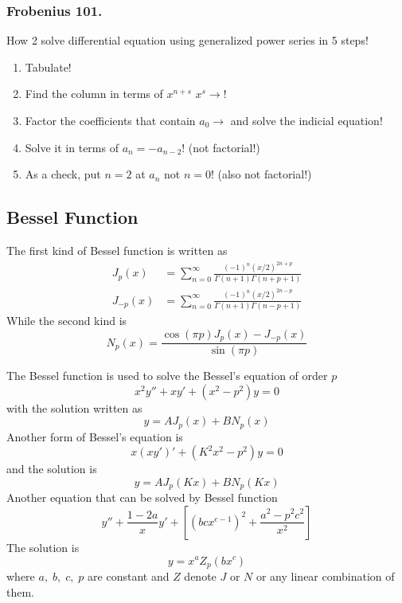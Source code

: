 \documentclass[../main.tex]{subfiles}
\begin{document}
\subsubsection*{Frobenius 101.} How 2 solve differential equation using generalized power series in 5 steps!
\begin{enumerate}
    \item Tabulate!
    \item Find the column in terms of $x^{n+s}$ $x^s\rightarrow$!
    \item Factor the coefficients that contain $a_0\rightarrow$ and solve the indicial equation!
    \item Solve it in terms of $a_n=-a_{n-2}$! (not factorial!)
    \item As a check, put $n=2$ at $a_n$ not $n=0$! (also not factorial!)
\end{enumerate}

\subsection*{Bessel Function}
The first kind of Bessel function is written as 
\begin{align*}
    J_p(x)&=\sum_{n=0}^{\infty}\frac{(-1)^n(x/2)^{2n+p}}{\Gamma(n+1)\Gamma(n+p+1)}\\
    J_{-p} (x)&=\sum_{n=0}^{\infty}\frac{(-1)^n(x/2)^{2n-p}}{\Gamma(n+1)\Gamma(n-p+1)}
\end{align*}
While the second kind is 
\begin{equation*}
    N_p(x)=\frac{\cos(\pi p)J_p(x)-J_{-p}(x)}{\sin(\pi p)}
\end{equation*}

The Bessel function is used to solve the Bessel's equation of order $p$
\begin{equation*}
    x^2 y'' + xy' + (x^2- p^2 )y = 0
\end{equation*}
with the solution written as 
\begin{equation*}
    y=AJ_p(x)+BN_p(x)
\end{equation*}
Another form of Bessel's equation is 
\begin{equation*}
    x(xy')' + (K^2x^2- p^2 )y = 0
\end{equation*}
and the solution is 
\begin{equation*}
    y=AJ_p(Kx)+BN_p(Kx)
\end{equation*}
Another equation that can be solved by Bessel function
\begin{equation*}
    y''+ \frac{1-2a}{x}y'+ \left[(bcx^{c-1})^2+ \frac{a^2-p^2c^2}{x^2}\right]
\end{equation*}
The solution is 
\begin{equation*}
    y=x^a Z_p(bx^c)
\end{equation*}
where $a,\;b,\;c,\;p$ are constant and $Z$ denote $J$ or $N$ or any linear combination of them.
\end{document}
